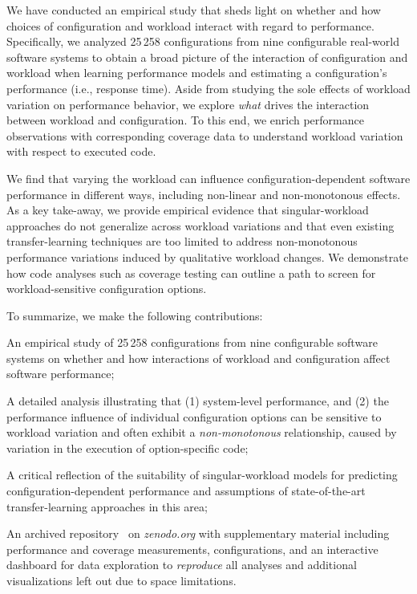 We have conducted an empirical study that sheds light on whether and how choices of configuration and workload interact with regard to performance. 
Specifically, we analyzed 25\,258 configurations from nine configurable real-world software systems to obtain a broad picture of the interaction of configuration and workload when learning performance models and estimating a configuration's performance (i.e., response time). Aside from studying the sole effects of workload variation on performance behavior, we explore \textit{what} drives the interaction between workload and configuration. To this end, we enrich performance observations with corresponding coverage data to understand workload variation with respect to executed code.


{
	\color{brown}
	We find that varying the workload can influence configuration-dependent software performance in different ways, including non-linear and non-monotonous effects. As a key take-away, we provide empirical evidence that singular-workload approaches do not generalize across workload variations  and that even existing transfer-learning techniques are too limited to address non-monotonous performance variations induced by qualitative workload changes. 
We demonstrate how code analyses such as coverage testing can outline a path to screen for workload-sensitive configuration options.
}

To summarize, we make the following contributions: 
\begin{compactitem}
	\item An empirical study of 25\,258 configurations from nine configurable software systems on whether and how interactions of workload and configuration affect software performance;
	{\color{black}
		\item A detailed analysis illustrating that (1) system-level performance, and (2) the performance influence of individual configuration options can be sensitive to workload variation and often exhibit a \textit{non-monotonous} relationship, caused by variation in the execution of option-specific  code;
		
		\item A critical reflection of the suitability of singular-workload models for predicting configuration-dependent performance and assumptions of state-of-the-art transfer-learning approaches in this area;}
	
	\item {\color{brown}An archived repository~\cite{muhlbauer_workload_2023_companion} on \textit{zenodo.org} with supplementary material including performance and coverage measurements, configurations, and an interactive dashboard for data exploration to \textit{reproduce} all analyses and additional visualizations left out due to space limitations.}
\end{compactitem}

